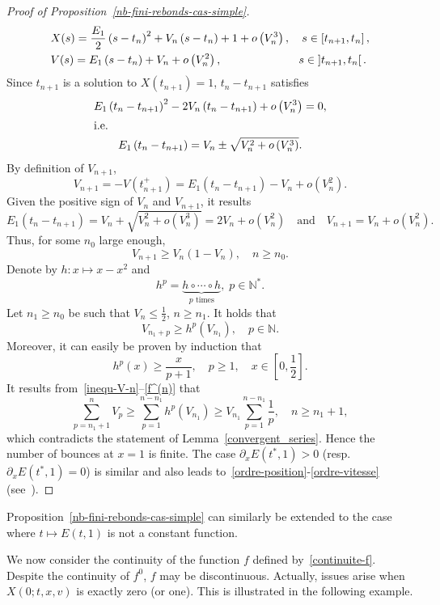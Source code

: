 \documentclass[10pt]{amsart}
\theoremstyle{definition}\newtheorem{defi}[theo]{Definition}\newtheorem{rema}[theo]{Remark}\newtheorem{exam}[theo]{Example}\newtheorem{exem}[theo]{Example}\newtheorem{nota}[theo]{Notation}
\newcommand{\N}{\mathbb{N}}
\begin{document}
\begin{proof}[{Proof of Proposition~\ref{nb-fini-rebonds-cas-simple}}]
\begin{align}
&X(s)= \frac{E_1}{2}\left(s-t_n\right)^2+V_n\left(s-t_n\right)+1+o\left(V_n^3\right), \quad s\in \left[t_{n+1},t_n\right],\label{ordre-position}
\\
&V(s)= E_1\left(s-t_n\right)+V_n+o\left(V_n^2\right),\mkern122mu s\in\left]t_{n+1},t_n\right[.\label{ordre-vitesse}
\end{align}
Since $t_{n+1}$ is a solution to $X(t_{n+1}) = 1$, $t_n-t_{n+1}$ satisfies
\begin{gather*}
E_1\left(t_n-t_{n+1}\right)^2-2V_n\left(t_n-t_{n+1}\right)+o\left(V_n^3\right)= 0,
\\
\intertext{i.e.}
E_1\left(t_n-t_{n+1}\right) = V_n \pm \sqrt{V_n^2 +o\left(V_n^3\right)}.
\end{gather*}
By definition of $V_{n+1}$,
\[
V_{n+1} = - V\left(t_{n+1}^+\right) = E_1\left(t_n-t_{n+1}\right)-V_n+o\left(V_n^2\right).
\]
Given the positive sign of $V_n$ and $V_{n+1}$, it results
\[
E_1\left(t_n-t_{n+1}\right) = V_n +\sqrt{V_n^2 +o\left(V_n^3\right)}= 2V_n+o\left(V_n^2\right)\quad \text{and}\quad V_{n+1} = V_n+o\left(V_n^2\right).
\]
Thus, for some $n_0$ large enough,
\[
V_{n+1} \geq V_n \left(1 - V_n\right), \quad n \geq n_0.
\]
Denote by $h : x \mapsto x - x^2$ and
\[
h^p = \underbrace{h \circ \cdots \circ h}_{p \text{ times}},\;p \in \N^*.
\]
Let $n_1\geq n_0$ be such that $V_n\leq
\tfrac{1}{2}$, $n\geq n_1$. It holds that
\begin{equation}\label{inequ-V-n}
V_{n_1+p} \geq h^{p}\left(V_{n_1}\right), \quad p \in \N.
\end{equation}
Moreover, it can easily be proven by induction that
\begin{equation}\label{f^(n)}
h^p(x) \geq \frac{x}{p+1},\quad p \geq 1,\quad x \in \left[0, \frac{1}{2} \right].
\end{equation}
It results from~\eqref{inequ-V-n}--\eqref{f^(n)} that
\[
\sum_{p= n_1+1}^n V_p \geq \sum_{p= 1}^{n-n_1} h^p \left(V_{n_1}\right) \geq V_{n_1} \sum_{p= 1}^{n-n_1} \frac{1}{p},\quad n \geq n_1+1,
\]
which contradicts the statement of Lemma~\ref{convergent_series}. Hence the number of bounces at $x=1$ is finite. The case $\partial_x E(t^*,1)>0$ (resp. $\partial_x E(t^*,1)=0$) is similar and also leads to~\eqref{ordre-position}-\eqref{ordre-vitesse} (see~\cite{Gio19}).
\end{proof}

Proposition~\ref{nb-fini-rebonds-cas-simple} can similarly be extended to the case where $t \mapsto E(t,1)$ is not a constant function.

We now consider the continuity of the function $f$ defined by~\eqref{continuite-f}. Despite the continuity of $f^0$, $f$ may be discontinuous. Actually, issues arise when $X(0;t,x,v)$ is exactly zero (or one). This is illustrated in the following example.
\end{document}
